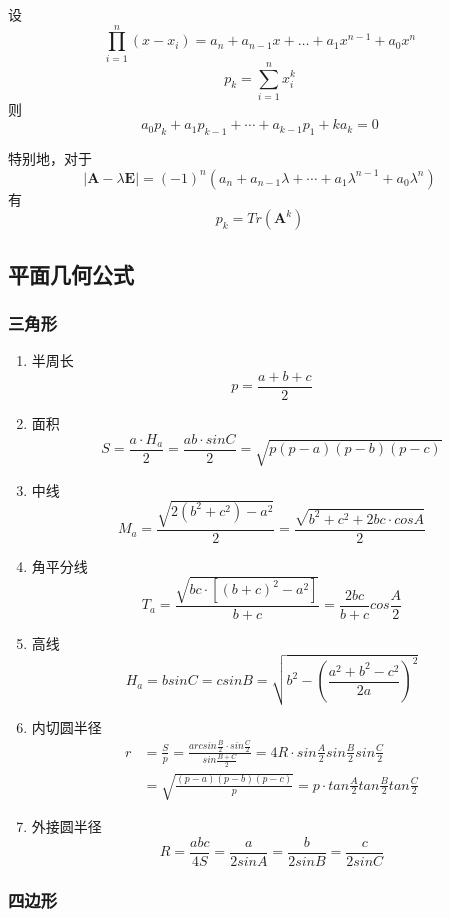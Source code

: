 \documentclass[a4paper]{article}
\begin{document}
设$$\prod_{i = 1}^n{(x - x_i)} = a_n + a_{n - 1} x + \dots + a_1 x^{n - 1} + a_0 x^n$$
$$p_k = \sum_{i = 1}^n{x_i^k}$$
则$$a_0 p_k + a_1 p_{k - 1} + \cdots + a_{k - 1} p_1 + k a_k = 0$$

特别地，对于$$|\bm{A} - \lambda \bm{E}| = (-1)^n(a_n + a_{n - 1} \lambda + \cdots + a_1 \lambda^{n - 1} + a_0 \lambda^n)$$
有$$p_k = Tr(\bm{A}^k)$$


\subsection{平面几何公式}

\subsubsection{三角形}

\begin{enumerate}
	\item 半周长
	$$p=\frac{a+b+c}{2}$$
	\item 面积
	$$S=\frac{a \cdot H_a}{2}=\frac{ab \cdot sinC}{2}=\sqrt{p(p-a)(p-b)(p-c)}$$
	\item 中线
	$$M_a=\frac{\sqrt{2(b^2+c^2)-a^2}}{2}=\frac{\sqrt{b^2+c^2+2bc \cdot cosA}}{2}$$
	\item 角平分线 
	$$T_a=\frac{\sqrt{bc \cdot [(b+c)^2-a^2]}}{b+c}=\frac{2bc}{b+c}cos\frac{A}{2}$$
	\item 高线
	$$H_a=bsinC=csinB=\sqrt{b^2-(\frac{a^2+b^2-c^2}{2a})^2}$$
	\item 内切圆半径
	\begin{align*}
	r&=\frac{S}{p}=\frac{arcsin\frac{B}{2} \cdot sin\frac{C}{2}}{sin\frac{B+C}{2}}=4R \cdot sin\frac{A}{2}sin\frac{B}{2}sin\frac{C}{2}\\
	&=\sqrt{\frac{(p-a)(p-b)(p-c)}{p}}=p \cdot tan\frac{A}{2}tan\frac{B}{2}tan\frac{C}{2}
	\end{align*}
	\item 外接圆半径
	$$R=\frac{abc}{4S}=\frac{a}{2sinA}=\frac{b}{2sinB}=\frac{c}{2sinC}$$
\end{enumerate}

\subsubsection{四边形}
\end{document}
